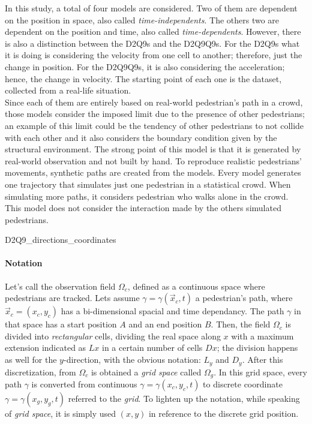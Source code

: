 \documentclass[class=article, crop=false]{standalone}
\begin{document}
In this study, a total of four models are considered. 
Two of them are dependent on the position in space, also called \emph{time-independents}. 
The others two are dependent on the position and time, also called \emph{time-dependents}.
However, there is also a distinction between the D2Q9s and the D2Q9Q9s. 
For the D2Q9s what it is doing is considering the velocity from one cell to another; therefore, just the change in position. 
For the D2Q9Q9s, it is also considering the acceleration; hence, the change in velocity. 
The starting point of each one is the dataset, collected from a real-life situation.
\\Since each of them are entirely based on real-world pedestrian’s path in a crowd, those models consider the imposed limit due to the presence of other pedestrians;
an example of this limit could be the tendency of other pedestrians to not collide with each other and it also considers the boundary condition given by the structural environment. 
The strong point of this model is that it is generated by real-world observation and not built by hand. 
To reproduce realistic pedestrians’ movements, synthetic paths are created from the models. 
Every model generates one trajectory that simulates just one pedestrian in a statistical crowd. 
When simulating more paths, it considers pedestrian who walks alone in the crowd. 
This model does not consider the interaction made by the others simulated pedestrians.

	{D2Q9_directions_coordinates}
	

\paragraph{Notation}
Let's call the observation field $\Omega_c$, defined as a continuous space where pedestrians are tracked.
Lets assume $\gamma=\gamma( \vec x_c, t)$ a pedestrian's path, where $\vec x_c = (x_c, y_c)$ has a bi-dimensional spacial and time dependancy.
The path $\gamma$ in that space has a start position $A$ and an end position $B$. 
Then, the field $\Omega_c$ is divided into \emph{rectangular} cells, dividing the real space along $x$ with a maximum extension indicated as $Lx$ in a certain number of cells $Dx$; 
the division happens as well for the $y$-direction, with the obvious notation: $L_y$ and $D_y$.
After this discretization, from $\Omega_c$ is obtained a \emph{grid space} called $\Omega_g$. 
In this grid space, every path $\gamma$ is converted from continuous $\gamma=\gamma(x_c, y_c, t)$ to discrete coordinate  $\gamma=\gamma(x_g, y_g, t)$ referred to the \emph{grid}. 
To lighten up the notation, while speaking of \emph{grid space}, it is simply used $(x, y)$ in reference to the discrete grid position.
\end{document}
